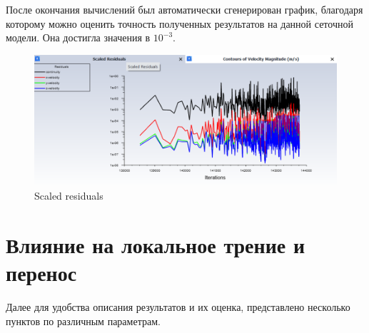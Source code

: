 	После окончания вычислений был автоматически сгенерирован график, благодаря которому можно оценить точность полученных результатов на данной сеточной модели. Она достигла значения в $10^{-3}$.
	\begin{figure}[H]
		\centering
		\includegraphics[width=1\linewidth]{../Assets/scaledResiduals}
		\caption{Scaled residuals}
		\label{fig:scaledresiduals}
	\end{figure}
	
\section{Влияние на локальное трение и перенос}
	Далее для удобства описания результатов и их оценка, представлено несколько пунктов по различным параметрам.
